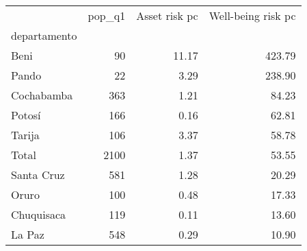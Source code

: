 \begin{tabular}{lrrr}
\toprule
{} &  pop\_q1 &  Asset risk pc &  Well-being risk pc \\
departamento &         &                &                     \\
\midrule
Beni         &      90 &          11.17 &              423.79 \\
Pando        &      22 &           3.29 &              238.90 \\
Cochabamba   &     363 &           1.21 &               84.23 \\
Potosí       &     166 &           0.16 &               62.81 \\
Tarija       &     106 &           3.37 &               58.78 \\
Total        &    2100 &           1.37 &               53.55 \\
Santa Cruz   &     581 &           1.28 &               20.29 \\
Oruro        &     100 &           0.48 &               17.33 \\
Chuquisaca   &     119 &           0.11 &               13.60 \\
La Paz       &     548 &           0.29 &               10.90 \\
\bottomrule
\end{tabular}
